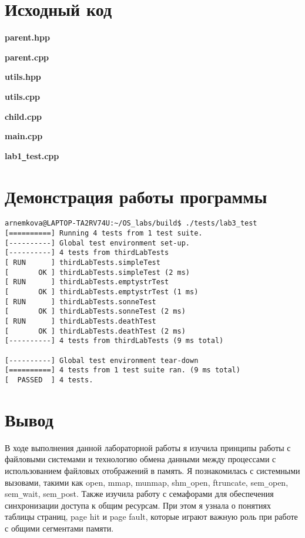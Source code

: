 \documentclass[a4paper, 14pt]{article}
\begin{document}
\section*{Исходный код}

\textbf{parent.hpp}


\textbf{parent.cpp}


\textbf{utils.hpp}


\textbf{utils.cpp}


\textbf{child.cpp}


\textbf{main.cpp}


\textbf{lab1\texttt{\_}test.cpp}

\newpage

\section*{Демонстрация работы программы}
\begin{verbatim}
arnemkova@LAPTOP-TA2RV74U:~/OS_labs/build$ ./tests/lab3_test
[==========] Running 4 tests from 1 test suite.
[----------] Global test environment set-up.
[----------] 4 tests from thirdLabTests
[ RUN      ] thirdLabTests.simpleTest
[       OK ] thirdLabTests.simpleTest (2 ms)
[ RUN      ] thirdLabTests.emptystrTest
[       OK ] thirdLabTests.emptystrTest (1 ms)
[ RUN      ] thirdLabTests.sonneTest
[       OK ] thirdLabTests.sonneTest (2 ms)
[ RUN      ] thirdLabTests.deathTest
[       OK ] thirdLabTests.deathTest (2 ms)
[----------] 4 tests from thirdLabTests (9 ms total)

[----------] Global test environment tear-down
[==========] 4 tests from 1 test suite ran. (9 ms total)
[  PASSED  ] 4 tests.
\end{verbatim}

\section*{Вывод}

В ходе выполнения данной лабораторной работы я изучила принципы работы с файловыми системами и технологию обмена данными между процессами с использованием файловых отображений в память. Я познакомилась с системными вызовами, такими как open, mmap, munmap, shm\texttt{\_}open, ftruncate, sem\texttt{\_}open, sem\texttt{\_}wait, sem\texttt{\_}post. Также изучила работу с семафорами для обеспечения синхронизации доступа к общим ресурсам. При этом я узнала о понятиях таблицы страниц, page hit и page fault, которые играют важную роль при работе с общими сегментами памяти.
\end{document}
